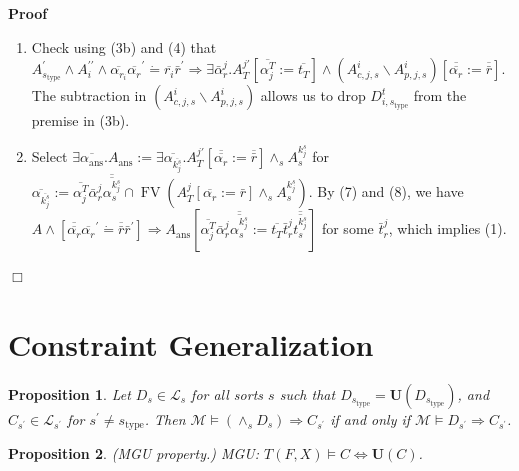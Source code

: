 \documentclass{article}
\newcommand{\assign}{:=}
\newcommand{\tmem}[1]{{\em #1\/}}
\newcommand{\tmmathbf}[1]{\ensuremath{\boldsymbol{#1}}}
\newcommand{\tmop}[1]{\ensuremath{\operatorname{#1}}}
\newenvironment{proof}{\noindent\textbf{Proof\ }}{\hspace*{\fill}$\Box$\medskip}
\newtheorem{proposition}{Proposition}
\begin{document}
\begin{proof}
\begin{enumerate}
    \item Check using (3b) and (4) that $A^{\prime}_{s_{\tmop{type}}} \wedge
    A^{\prime\prime}_i \wedge \overline{\alpha_{r_i}}
    \overline{\alpha_r}^{\prime} \dot{=} \overline{r_i} \bar{r}^{\prime}
    \Rightarrow \exists \bar{\alpha}_r^j .A_T^{j\prime} [\overline{\alpha_j^T}
    \assign \overline{t_T}] \wedge (A^i_{c, j, s} \backslash A^i_{p, j, s})
    [\overline{\overline{\alpha_r}} \assign \overline{\bar{r}}]$. The
    subtraction in $(A^i_{c, j, s} \backslash A^i_{p, j, s})$ allows us to
    drop $D^t_{i, s_{\tmop{type}}}$ from the premise in (3b).
    
    \item Select $\exists \overline{\alpha_{\tmop{ans}}} .A_{\tmop{ans}}
    \assign \exists \overline{\alpha_{\overline{k_j^s}}} .A_T^{j\prime}
    [\overline{\overline{\alpha_r}} \assign \overline{\bar{r}}] \wedge_s
    A_s^{k_j^s}$ for $\overline{\alpha_{\overline{k_j^s}}} \assign
    \overline{\alpha_j^T} \bar{\alpha}_r^j
    \overline{\overline{\alpha_s^{k_j^s}}} \cap \tmop{FV} (A_T^j
    [\overline{\alpha_r} \assign \bar{r}] \wedge_s A_s^{k_j^s})$. By (7) and
    (8), we have $A \wedge [\overline{\overline{\alpha_r}}
    \overline{\alpha_r}^{\prime} \dot{=} \overline{\bar{r}} \bar{r}^{\prime}]
    \Rightarrow A_{\tmop{ans}} \left[ \overline{\alpha_j^T} \bar{\alpha}_r^j
    \overline{\overline{\alpha_s^{k_j^s}}} \assign \overline{t_T} \bar{t}_r^j
    \overline{\overline{t_s^{k_j^s}}} \right]$ for some $\bar{t}_r^j$, which
    implies (1).
  \end{enumerate}
\end{proof}

\section{Constraint Generalization}\label{LUBProofs}

\begin{proposition}
  \label{SepProp}Let $D_s \in \mathcal{L}_s$ for all sorts $s$ such that
  $D_{s_{\tmop{type}}} =\tmmathbf{U} (D_{s_{\tmop{type}}})$, and
  $C_{s^{\prime}} \in \mathcal{L}_{s^{\prime}}$ for $s^{\prime} \neq
  s_{\tmop{type}}$. Then $\mathcal{M} \vDash (\wedge_s D_s) \Rightarrow
  C_{s^{\prime}}$ if and only if $\mathcal{M} \vDash D_{s^{\prime}}
  \Rightarrow C_{s^{\prime}}$.
\end{proposition}

\begin{proposition}
  {\tmem{(MGU property.)}} MGU: $T (F, X) \vDash C \Leftrightarrow
  \tmmathbf{U} (C)$.
\end{proposition}
\end{document}
